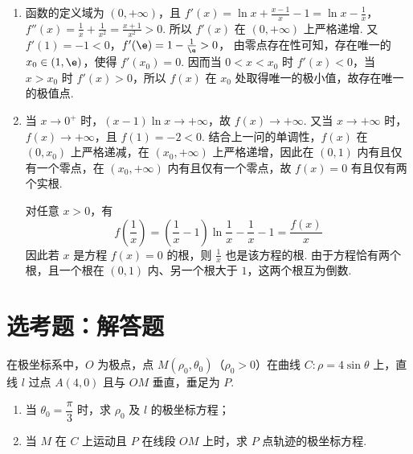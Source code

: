 \begin{solution}
\begin{enumerate}
\item 函数的定义域为 \((0,+\infty)\)，且
\(f'(x)=\ln x+\frac{x-1}{x}-1=\ln x-\frac1x\)，\(f''(x)=\frac1x+\frac1{x^2}=\frac{x+1}{x^2}>0\).
所以 \(f'(x)\) 在 \((0,+\infty)\) 上严格递增. 又
\(f'(1)=-1<0\)，\(f'(\e)=1-\frac1{\e}>0\)，
由零点存在性可知，存在唯一的 \(x_0\in(1,\e)\)，使得 \(f'(x_0)=0\). 因而当 \(0<x<x_0\) 时 \(f'(x)<0\)，当 \(x>x_0\) 时 \(f'(x)>0\)，所以 \(f(x)\) 在 \(x_0\) 处取得唯一的极小值，故存在唯一的极值点.

\item 当 \(x\to0^+\) 时，\((x-1)\ln x\to+\infty\)，故 \(f(x)\to+\infty\). 又当 \(x\to+\infty\) 时，\(f(x)\to+\infty\)，且 \(f(1)=-2<0\). 结合上一问的单调性，\(f(x)\) 在 \((0,x_0)\) 上严格递减，在 \((x_0,+\infty)\) 上严格递增，因此在 \((0,1)\) 内有且仅有一个零点，在 \((x_0,+\infty)\) 内有且仅有一个零点，故 \(f(x)=0\) 有且仅有两个实根.

对任意 \(x>0\)，有
\[
f\left(\frac1x\right)=\left(\frac1x-1\right)\ln\frac1x-\frac1x-1=\frac{f(x)}{x}
\]
因此若 \(x\) 是方程 \(f(x)=0\) 的根，则 \(\frac{1}{x}\) 也是该方程的根. 由于方程恰有两个根，且一个根在 \((0,1)\) 内、另一个根大于 \(1\)，这两个根互为倒数.
\end{enumerate}
\end{solution}

\section{选考题：解答题}

\begin{problem}
在极坐标系中，\(O\) 为极点，点 \(M(\rho_0,\theta_0)\)（\(\rho_0>0\)）在曲线 \(C:\rho=4\sin\theta\) 上，直线 \(l\) 过点 \(A(4,0)\) 且与 \(OM\) 垂直，垂足为 \(P\).

\begin{enumerate}
\item 当 \(\theta_0=\dfrac{\pi}{3}\) 时，求 \(\rho_0\) 及 \(l\) 的极坐标方程；
\item 当 \(M\) 在 \(C\) 上运动且 \(P\) 在线段 \(OM\) 上时，求 \(P\) 点轨迹的极坐标方程.
\end{enumerate}
\end{problem}

